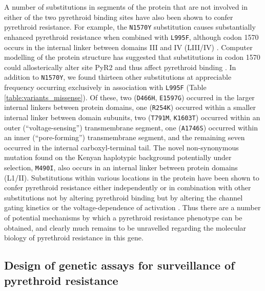 \documentclass[a4paper,11pt,abstracton,hidelinks]{scrartcl}
\begin{document}
%
A number of substitutions in segments of the protein that are not involved in either of the two pyrethroid binding sites have also been shown to confer pyrethroid resistance.
%
For example, the \texttt{N1570Y} substitution causes substantially enhanced pyrethroid resistance when combined with \texttt{L995F}, although codon 1570 occurs in the internal linker between domains III and IV (LIII/IV) \cite{Du2013}.
%
Computer modelling of the protein structure has suggested that substitutions in codon 1570 could allosterically alter site PyR2 and thus affect pyrethroid binding \cite{Du2013}.
%
In addition to \texttt{N1570Y}, we found thirteen other substitutions at appreciable frequency occurring exclusively in association with \texttt{L995F} (Table \ref{table:variants_missense}).
%
Of these, two (\texttt{D466H}, \texttt{E1597G}) occurred in the larger internal linkers between protein domains, one (\texttt{R254K}) occurred within a smaller internal linker between domain subunits, two (\texttt{T791M}, \texttt{K1603T}) occurred within an outer (``voltage-sensing'') transmembrane segment, one (\texttt{A1746S}) occurred within an inner (``pore-forming'') transmembrane segment, and the remaining seven occurred in the internal carboxyl-terminal tail.
%
The novel non-synonymous mutation found on the Kenyan haplotypic background potentially under selection, \texttt{M490I}, also occurs in an internal linker between protein domains (L1/II).
%
Substitutions within various locations in the protein have been shown to confer pyrethroid resistance either independently or in combination with other substitutions not by altering pyrethroid binding but by altering the channel gating kinetics or the voltage-dependence of activation \cite{Dong2014}.
%
Thus there are a number of potential mechanisms by which a pyrethroid resistance phenotype can be obtained, and clearly much remains to be unravelled regarding the molecular biology of pyrethroid resistance in this gene.


\subsection*{Design of genetic assays for surveillance of pyrethroid resistance}
\end{document}
